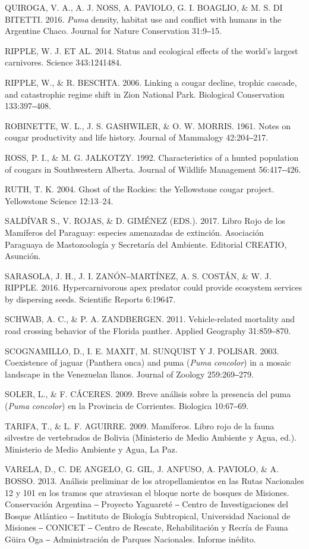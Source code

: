\documentclass[
  x11names]{article}
\begin{document}
QUIROGA, V. A., A. J. NOSS, A. PAVIOLO, G. I. BOAGLIO, \& M. S. DI
BITETTI. 2016. \textit{Puma} density, habitat use and conflict with
humans in the Argentine Chaco. Journal for Nature Conservation 31:9‒15.

RIPPLE, W. J. ET AL. 2014. Status and ecological effects of the world's
largest carnivores. Science 343:1241484.

RIPPLE, W., \& R. BESCHTA. 2006. Linking a cougar decline, trophic
cascade, and catastrophic regime shift in Zion National Park. Biological
Conservation 133:397‒408.

ROBINETTE, W. L., J. S. GASHWILER, \& O. W. MORRIS. 1961. Notes on
cougar productivity and life history. Journal of Mammalogy 42:204‒217.

ROSS, P. I., \& M. G. JALKOTZY. 1992. Characteristics of a hunted
population of cougars in Southwestern Alberta. Journal of Wildlife
Management 56:417‒426.

RUTH, T. K. 2004. Ghost of the Rockies: the Yellowstone cougar project.
Yellowstone Science 12:13--24.

SALDÍVAR S., V. ROJAS, \& D. GIMÉNEZ (EDS.). 2017. Libro Rojo de los
Mamíferos del Paraguay: especies amenazadas de extinción. Asociación
Paraguaya de Mastozoología y Secretaría del Ambiente. Editorial CREATIO,
Asunción.

SARASOLA, J. H., J. I. ZANÓN‒MARTÍNEZ, A. S. COSTÁN, \& W. J. RIPPLE.
2016. Hypercarnivorous apex predator could provide ecosystem services by
dispersing seeds. Scientific Reports 6:19647.

SCHWAB, A. C., \& P. A. ZANDBERGEN. 2011. Vehicle-related mortality and
road crossing behavior of the Florida panther. Applied Geography
31:859‒870.

SCOGNAMILLO, D., I. E. MAXIT, M. SUNQUIST Y J. POLISAR. 2003.
Coexistence of jaguar (Panthera onca) and puma (\textit{Puma}
\textit{concolor}) in a mosaic landscape in the Venezuelan llanos.
Journal of Zoology 259:269‒279.

SOLER, L., \& F. CÁCERES. 2009. Breve análisis sobre la presencia del
puma (\textit{Puma} \textit{concolor}) en la Provincia de Corrientes.
Biologica 10:67‒69.

TARIFA, T., \& L. F. AGUIRRE. 2009. Mamíferos. Libro rojo de la fauna
silvestre de vertebrados de Bolivia (Ministerio de Medio Ambiente y
Agua, ed.). Ministerio de Medio Ambiente y Agua, La Paz.

VARELA, D., C. DE ANGELO, G. GIL, J. ANFUSO, A. PAVIOLO, \& A. BOSSO.
2013. Análisis preliminar de los atropellamientos en las Rutas
Nacionales 12 y 101 en los tramos que atraviesan el bloque norte de
bosques de Misiones. Conservación Argentina ‒ Proyecto Yaguareté ‒
Centro de Investigaciones del Bosque Atlántico ‒ Instituto de Biología
Subtropical, Universidad Nacional de Misiones ‒ CONICET ‒ Centro de
Rescate, Rehabilitación y Recría de Fauna Güira Oga ‒ Administración de
Parques Nacionales. Informe inédito.
\end{document}
